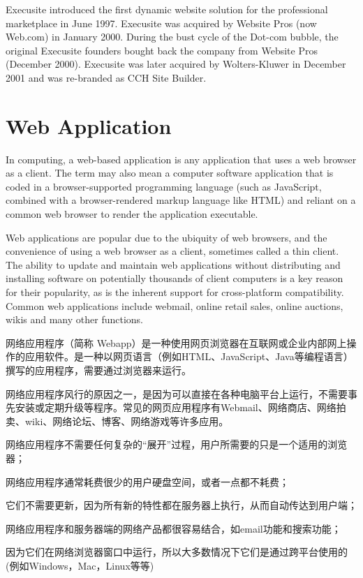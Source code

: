 Execusite introduced the first dynamic website solution for the professional marketplace in June 1997. Execusite was acquired by Website Pros (now Web.com) in January 2000. During the bust cycle of the Dot-com bubble, the original Execusite founders bought back the company from Website Pros (December 2000). Execusite was later acquired by Wolters-Kluwer in December 2001 and was re-branded as CCH Site Builder.





\chapter{Web Application}

In computing, a web-based application\cite{web_application} is any application that uses a web browser as a client. The term may also mean a computer software application that is coded in a browser-supported programming language (such as JavaScript, combined with a browser-rendered markup language like HTML) and reliant on a common web browser to render the application executable.


Web applications are popular due to the ubiquity of web browsers, and the convenience of using a web browser as a client, sometimes called a thin client. The ability to update and maintain web applications without distributing and installing software on potentially thousands of client computers is a key reason for their popularity, as is the inherent support for cross-platform compatibility. Common web applications include webmail, online retail sales, online auctions, wikis and many other functions.

网络应用程序（简称 Webapp）是一种使用网页浏览器在互联网或企业内部网上操作的应用软件。是一种以网页语言（例如HTML、JavaScript、Java等编程语言）撰写的应用程序，需要通过浏览器来运行。

网络应用程序风行的原因之一，是因为可以直接在各种电脑平台上运行，不需要事先安装或定期升级等程序。常见的网页应用程序有Webmail、网络商店、网络拍卖、wiki、网络论坛、博客、网络游戏等许多应用。

\begin{compactitem}
\item 网络应用程序不需要任何复杂的“展开”过程，用户所需要的只是一个适用的浏览器；
\item 网络应用程序通常耗费很少的用户硬盘空间，或者一点都不耗费；
\item 它们不需要更新，因为所有新的特性都在服务器上执行，从而自动传达到用户端；
\item 网络应用程序和服务器端的网络产品都很容易结合，如email功能和搜索功能；
\item 因为它们在网络浏览器窗口中运行，所以大多数情况下它们是通过跨平台使用的 (例如Windows，Mac，Linux等等)
\end{compactitem}




